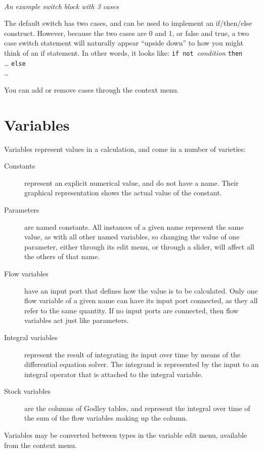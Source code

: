 \begin{center}
\\
{\em An example switch block with 3 cases}
\end{center}

The default switch has two cases, and can be used to implement an
if/then/else construct. However, because the two cases are 0 and 1,
or false and true, a two case switch statement will naturally appear
``upside down'' to how you might think of an if statement. In other
words, it looks like:
{\tt if not }{\em condition} {\tt then}\\
 \ldots
{\tt else}\\
\ldots

You can add or remove cases through the context menu. 

\section{Variables}

Variables represent values in a calculation, and come in a number of
varieties:
\begin{description}
\item[Constants] represent an explicit numerical value, and do not
have a name. Their graphical representation shows the actual value of
the constant.
\item[Parameters] are named constants. All instances of a given name
represent the same value, as with all other named variables, so
changing the value of one parameter, either through its edit menu, or
through a slider, will affect all the others of that name.
\item[Flow variables] have an input port that defines how the value is
to be calculated. Only one flow variable of a given name can have its
input port connected, as they all refer to the same quantity. If no
input ports are connected, then flow variables act just like
parameters.
\item[Integral variables] represent the result of integrating its
input over time  by means of the differential
equation solver. The integrand is represented by the input to an
integral operator that is attached to the integral variable.
\item[Stock variables] are the columns of Godley tables, and represent
the integral over time of the sum of the flow variables making up the
column.
\end{description}

Variables may be converted between types in the variable edit menu,
available from the context menu.

